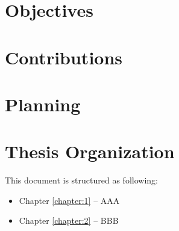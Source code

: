 \section{Objectives}


\section{Contributions}
\section{Planning}
\section{Thesis Organization}


This document is structured as following: 
\begin{itemize}
\item Chapter \ref{chapter:1} – AAA 
\item Chapter \ref{chapter:2} – BBB 
\end{itemize}

